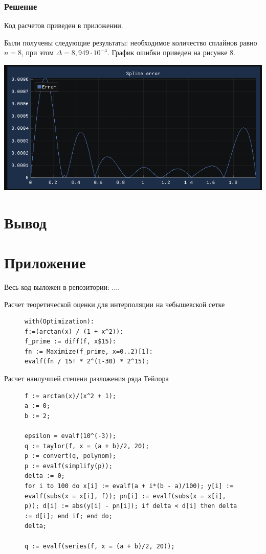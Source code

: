 \documentclass[a4paper, fontsize=14pt]{article}
\begin{document}
    \subsubsection*{Решение}

    Код расчетов приведен в приложении. 

    Были получены следующие результаты: необходимое количество сплайнов равно $n=8$, при этом $\Delta = 8,949 \cdot 10^{-4}$. График ошибки приведен на рисунке 8.

    \begin{center}
        \includegraphics[]{src/spline_error.png}
    \end{center}
    \newpage
\section*{{Вывод}}

\newpage
\section*{{Приложение}}

Весь код выложен в репозитории: ....

Расчет теоретической оценки для интерполяции на чебышевской сетке
\begin{figure}[h!]
    \begin{verbatim}
with(Optimization):
f:=(arctan(x) / (1 + x^2)):
f_prime := diff(f, x$15):
fn := Maximize(f_prime, x=0..2)[1]:
evalf(fn / 15! * 2^(1-30) * 2^15);
    \end{verbatim}
\end{figure}


Расчет наилучшей степени разложения ряда Тейлора
\begin{figure}[h!]
    \begin{verbatim}
f := arctan(x)/(x^2 + 1);
a := 0;
b := 2;

epsilon = evalf(10^(-3));
q := taylor(f, x = (a + b)/2, 20);
p := convert(q, polynom);
p := evalf(simplify(p));
delta := 0;
for i to 100 do x[i] := evalf(a + i*(b - a)/100); y[i] := evalf(subs(x = x[i], f)); pn[i] := evalf(subs(x = x[i], p)); d[i] := abs(y[i] - pn[i]); if delta < d[i] then delta := d[i]; end if; end do;
delta;

q := evalf(series(f, x = (a + b)/2, 20));
    \end{verbatim}
\end{figure}
\end{document}
